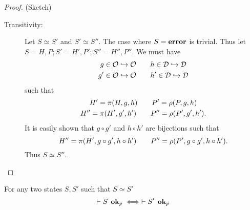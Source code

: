 \begin{proof}{(Sketch)}
\begin{description}
    \item[Transitivity:] Let $S \simeq S'$ and $S' \simeq S''$. The case where
      $S = \mbox{{\bf error}}$ is trivial. Thus let $S = H,P; S' = H',P'; S'' = H'', P''$.
      We must have
      \begin{equation*}
        \begin{gathered}
          g\in \mathcal{O} \hookrightarrow \mathcal{O} \quad\quad h\in \mathcal{D}
          \hookrightarrow \mathcal{D} \\
          g'\in \mathcal{O} \hookrightarrow \mathcal{O} \quad\quad h'\in \mathcal{D}
          \hookrightarrow \mathcal{D}
        \end{gathered}
      \end{equation*}
      such that
      \begin{equation*}
        \begin{gathered}
          H' = \pi(H, g, h) \quad\quad P' = \rho(P, g, h)  \\
          H'' = \pi(H', g', h') \quad\quad P'' = \rho(P', g', h').
        \end{gathered}
      \end{equation*}
      It is easily shown that $g \circ g'$ and $h \circ h'$ are bijections such
      that 
      \begin{equation*}
        H'' = \pi(H', g \circ g', h \circ h') \quad\quad P'' = \rho(P', g \circ
        g', h \circ h').
      \end{equation*}
      Thus $S \simeq S''$.
  \end{description}
\end{proof}

\begin{proposition*}
  For any two states $S, S'$  such that $S \simeq S'$
  \begin{equation*}
    \vdash S \:\: \mbox{{\bf ok}$_p$} \iff \vdash S' \:\: \mbox{{\bf ok}$_p$}
  \end{equation*}
\end{proposition*}

